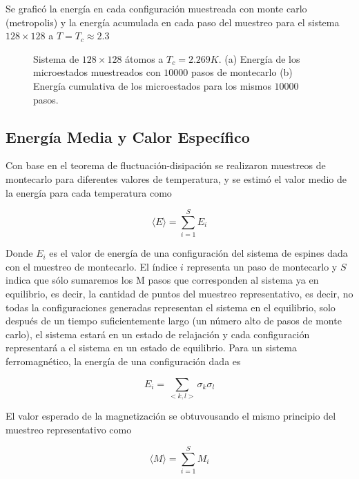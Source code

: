 \documentclass[a4paper,12pt]{article}
\begin{document}
\noindent Se graficó la energía en cada configuración muestreada con monte carlo (metropolis) y la energía acumulada en cada paso del muestreo para el sistema  $128 \times 128$ a $T = T_{c} \approx 2.3$
\begin{figure}[H]
  \centering
  \caption{Sistema de $128 \times 128$ átomos a $T_{c} = 2.269 K$. (a) Energía de los microestados muestreados con $10000$ pasos de montecarlo (b) Energía cumulativa de los microestados para los mismos $10000$ pasos.}
  \label{fig:E_time_128x128}
\end{figure}


\subsection{Energía Media y Calor Específico}

\noindent Con base en el teorema de fluctuación-disipación se realizaron muestreos de montecarlo para diferentes valores de temperatura, y se estimó el valor medio de la energía para cada temperatura como

\begin{equation}
  \langle E \rangle = \sum_{i=1}^{S} E_{i}
\end{equation}


\noindent Donde $E_{i}$ es el valor de energía de una configuración del sistema de espines dada con el muestreo de montecarlo. El índice $i$ representa un paso de montecarlo y $S$ indica que sólo sumaremos los M pasos que corresponden al sistema ya en equilibrio, es decir, la cantidad de puntos del muestreo representativo, es decir, no todas la configuraciones generadas representan el sistema en el equilibrio, solo después de un tiempo suficientemente largo (un número alto de pasos de monte carlo), el sistema estará en un estado de relajación y cada configuración representará a el sistema en un estado de equilibrio. Para un sistema ferromagnético, la energía de una configuración dada es

\begin{equation}
  E_{i} = \sum_{<k,l>} \sigma_{k} \sigma_{l}
\end{equation}

\noindent El valor esperado de la magnetización se obtuvousando el mismo principio del muestreo representativo como

\begin{equation}
  \langle M \rangle = \sum_{i=1}^{S} M_{i}
\end{equation}
\end{document}
